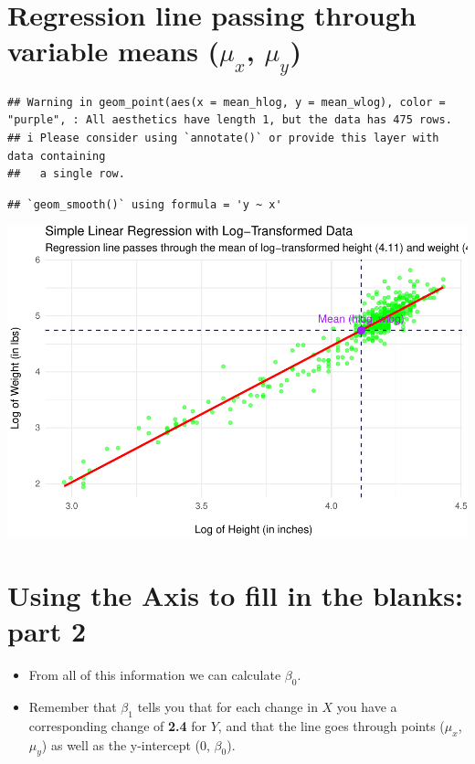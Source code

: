 \documentclass[
]{article}
\begin{document}
\hypertarget{regression-line-passing-through-variable-means-mu_x-mu_y}{%
\section{\texorpdfstring{Regression line passing through variable means
(\(\mu_x\),
\(\mu_y\))}{Regression line passing through variable means (\textbackslash mu\_x, \textbackslash mu\_y)}}\label{regression-line-passing-through-variable-means-mu_x-mu_y}}

\begin{verbatim}
## Warning in geom_point(aes(x = mean_hlog, y = mean_wlog), color = "purple", : All aesthetics have length 1, but the data has 475 rows.
## i Please consider using `annotate()` or provide this layer with data containing
##   a single row.
\end{verbatim}

\begin{verbatim}
## `geom_smooth()` using formula = 'y ~ x'
\end{verbatim}

\includegraphics{L8_Correlation_and_regression_pdf_files/figure-latex/unnamed-chunk-6-1.pdf}

\hypertarget{using-the-axis-to-fill-in-the-blanks-part-2}{%
\section{Using the Axis to fill in the blanks: part
2}\label{using-the-axis-to-fill-in-the-blanks-part-2}}

\begin{itemize}
\item
  From all of this information we can calculate \(\beta_0\).
\item
  Remember that \(\beta_1\) tells you that for each change in \(X\) you
  have a corresponding change of \textbf{2.4} for \(Y\), and that the
  line goes through points (\(\mu_x\), \(\mu_y\)) as well as the
  y-intercept (0, \(\beta_0\)).
\end{itemize}
\end{document}
